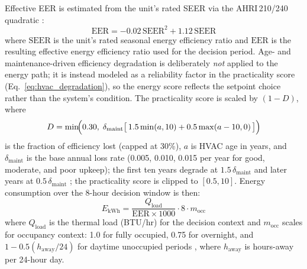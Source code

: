 \documentclass[a4paper,fleqn]{cas-dc}
\begin{document}
Effective EER is estimated from the unit's rated SEER via the AHRI\,210/240 quadratic \citep{ahri2008}:
\begin{equation}
  \mathrm{EER} = -0.02\,\mathrm{SEER}^{2} + 1.12\,\mathrm{SEER}
  \label{eq:eer_quadratic}
\end{equation}
\noindent where $\mathrm{SEER}$ is the unit's rated seasonal energy efficiency ratio and $\mathrm{EER}$ is the resulting effective energy efficiency ratio used for the decision period. Age- and maintenance-driven efficiency degradation is deliberately \emph{not} applied to the energy path; it is instead modeled as a reliability factor in the practicality score (Eq.~\ref{eq:hvac_degradation}), so the energy score reflects the setpoint choice rather than the system's condition. The practicality score is scaled by $(1 - D)$, where
\begin{equation}
  D = \min\!\Bigl(0.30,\; \delta_{\mathrm{maint}}\bigl[\,1.5\min(a,10) + 0.5\max(a-10,0)\,\bigr]\Bigr)
  \label{eq:hvac_degradation}
\end{equation}
\noindent is the fraction of efficiency lost (capped at 30\%), $a$ is HVAC age in years, and $\delta_{\mathrm{maint}}$ is the base annual loss rate (0.005, 0.010, 0.015 per year for good, moderate, and poor upkeep); the first ten years degrade at $1.5\,\delta_{\mathrm{maint}}$ and later years at $0.5\,\delta_{\mathrm{maint}}$ \citep{domanski2014}; the practicality score is clipped to $[0.5, 10]$. Energy consumption over the 8-hour decision window is then:
\begin{equation}
  E_{\mathrm{kWh}} =
    \frac{Q_{\mathrm{load}}}{\mathrm{EER} \times 1000}
    \cdot 8 \cdot m_{\mathrm{occ}}
  \label{eq:hvac_energy}
\end{equation}
\noindent where $Q_{\mathrm{load}}$ is the thermal load (BTU/hr) for the decision context and $m_{\mathrm{occ}}$ scales for occupancy context: 1.0 for fully occupied, 0.75 for overnight, and $1 - 0.5(h_{\mathrm{away}}/24)$ for daytime unoccupied periods \citep{houde2021}, where $h_{\mathrm{away}}$ is hours-away per 24-hour day.
\end{document}
